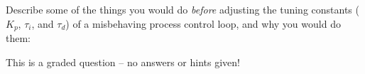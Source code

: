 

Describe some of the things you would do {\it before} adjusting the tuning constants ($K_p$, $\tau_i$, and $\tau_d$) of a misbehaving process control loop, and why you would do them:

\vfil

\eject






This is a graded question -- no answers or hints given!











